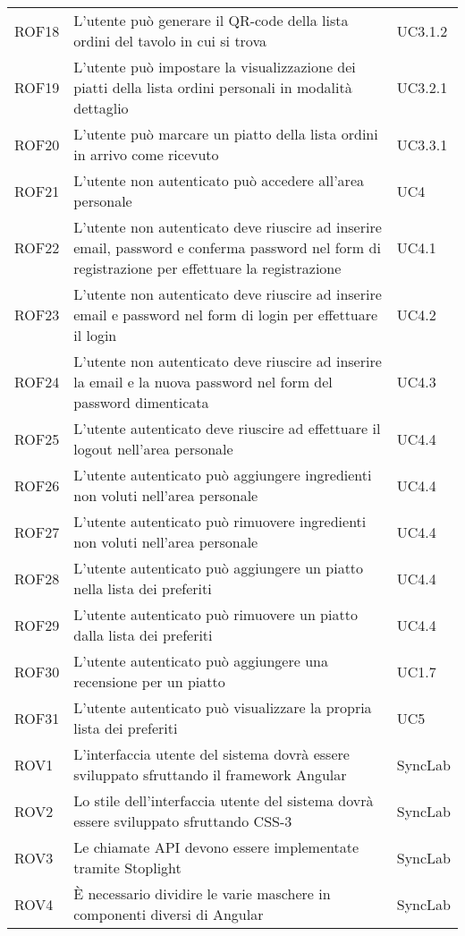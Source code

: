 \begin{center}
\begin{longtable}{ |p{1.5cm}|p{9cm}|p{1.5cm}|  }
        ROF18&L'utente può generare il QR-code della lista ordini del tavolo in cui si trova &UC3.1.2 \\
        ROF19&L'utente può impostare la visualizzazione dei piatti della lista ordini personali in modalità dettaglio&UC3.2.1 \\
        ROF20&L'utente può marcare un piatto della lista ordini in arrivo come ricevuto&UC3.3.1 \\
        ROF21&L'utente non autenticato può accedere all'area personale&UC4\\
        ROF22&L'utente non autenticato deve riuscire ad inserire email, password e conferma password nel form di registrazione per effettuare la registrazione &UC4.1\\
        ROF23&L'utente non autenticato deve riuscire ad inserire email e password nel form di login per effettuare il login &UC4.2\\
        ROF24&L'utente non autenticato deve riuscire ad inserire la email e la nuova password nel form del password dimenticata&UC4.3\\
        ROF25&L'utente autenticato deve riuscire ad effettuare il logout nell'area personale&UC4.4\\
        ROF26&L'utente autenticato può aggiungere ingredienti non voluti nell'area personale&UC4.4\\
        ROF27&L'utente autenticato può rimuovere ingredienti non voluti nell'area personale&UC4.4\\
        ROF28&L'utente autenticato può aggiungere un piatto nella lista dei preferiti&UC4.4\\
        ROF29&L'utente autenticato può rimuovere un piatto dalla lista dei preferiti&UC4.4\\
        ROF30&L'utente autenticato può aggiungere una recensione per un piatto&UC1.7\\
        ROF31&L'utente autenticato può visualizzare la propria lista dei preferiti&UC5\\
        ROV1&L'interfaccia utente del sistema dovrà essere sviluppato sfruttando il framework Angular&SyncLab\\
        ROV2&Lo stile dell'interfaccia utente del sistema dovrà essere sviluppato sfruttando CSS-3&SyncLab\\
        ROV3&Le chiamate API devono essere implementate tramite Stoplight&SyncLab\\
        ROV4&È necessario dividire le varie maschere in componenti diversi di Angular&SyncLab\\

\end{longtable}
\end{center}
